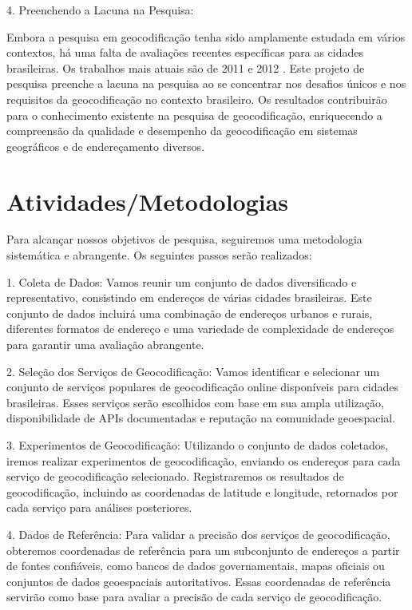 \documentclass{article}
\begin{document}
4. Preenchendo a Lacuna na Pesquisa:

Embora a pesquisa em geocodificação tenha sido amplamente estudada em vários contextos, há uma falta de avaliações recentes específicas para as cidades brasileiras. Os trabalhos mais atuais são de 2011 e 2012 \cite{davis2011evaluation,martins2012geocodificacao}. Este projeto de pesquisa preenche a lacuna na pesquisa ao se concentrar nos desafios únicos e nos requisitos da geocodificação no contexto brasileiro. Os resultados contribuirão para o conhecimento existente na pesquisa de geocodificação, enriquecendo a compreensão da qualidade e desempenho da geocodificação em sistemas geográficos e de endereçamento diversos.
   
\section{Atividades/Metodologias}

Para alcançar nossos objetivos de pesquisa, seguiremos uma metodologia sistemática e abrangente. Os seguintes passos serão realizados:

1. Coleta de Dados: Vamos reunir um conjunto de dados diversificado e representativo, consistindo em endereços de várias cidades brasileiras. Este conjunto de dados incluirá uma combinação de endereços urbanos e rurais, diferentes formatos de endereço e uma variedade de complexidade de endereços para garantir uma avaliação abrangente.

2. Seleção dos Serviços de Geocodificação: Vamos identificar e selecionar um conjunto de serviços populares de geocodificação online disponíveis para cidades brasileiras. Esses serviços serão escolhidos com base em sua ampla utilização, disponibilidade de APIs documentadas e reputação na comunidade geoespacial.

3. Experimentos de Geocodificação: Utilizando o conjunto de dados coletados, iremos realizar experimentos de geocodificação, enviando os endereços para cada serviço de geocodificação selecionado. Registraremos os resultados de geocodificação, incluindo as coordenadas de latitude e longitude, retornados por cada serviço para análises posteriores.

4. Dados de Referência: Para validar a precisão dos serviços de geocodificação, obteremos coordenadas de referência para um subconjunto de endereços a partir de fontes confiáveis, como bancos de dados governamentais, mapas oficiais ou conjuntos de dados geoespaciais autoritativos. Essas coordenadas de referência servirão como base para avaliar a precisão de cada serviço de geocodificação.
\end{document}

